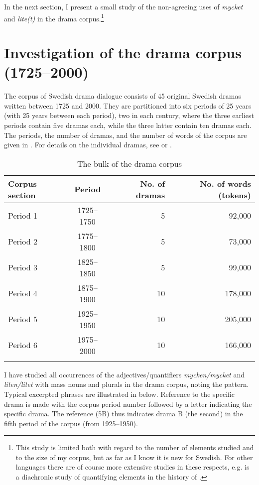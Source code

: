 \documentclass[output=paper]{langscibook}
\begin{document}
In the next section, I present a small study of the non-agreeing uses of \textit{mycket} and \textit{lite(t)} in the drama corpus.\footnote{This study is limited both with regard to the number of elements studied and to the size of my corpus, but as far as I know it is new for Swedish. For other languages there are of course more extensive studies in these respects, e.g. \citet{RoehrsSapp2016} is a diachronic study of quantifying elements in the history of .} 


\section{Investigation of the drama corpus (1725–2000)}\label{sec:delsing:3}


The corpus of Swedish drama dialogue consists of 45 original Swedish dramas written between 1725 and 2000. They are partitioned into six periods of 25 years (with 25 years between each period), two in each century, where the three earliest periods contain five dramas each, while the three latter contain ten dramas each. The periods, the number of dramas, and the number of words of the corpus are given in . For details on the individual dramas, see \citet{MarttalaStromquist2001} or \citet[38–39 and Appendix 1]{Stroh-Wollin2008}.



\begin{table}
\caption{The bulk of the drama corpus\label{tab:delsing:2}}
\begin{tabular}{lcrr}
\lsptoprule
Corpus section & Period & No. of dramas & No. of words (tokens)\\
\midrule
Period 1 & 1725–1750 & 5 & 92,000\\
Period 2 & 1775–1800 & 5 & 73,000\\
Period 3 & 1825–1850 & 5 & 99,000\\
Period 4 & 1875–1900 & 10 & 178,000\\
Period 5 & 1925–1950 & 10 & 205,000\\
Period 6 & 1975–2000 & 10 & 166,000\\
\lspbottomrule
\end{tabular}
\end{table}

I have studied all occurrences of the adjectives/quantifiers \textit{mycken/mycket} and \textit{liten/litet} with mass nouns and plurals in the drama corpus, noting the  pattern. Typical excerpted phrases are illustrated in  below. Reference to the specific drama is made with the corpus period number followed by a letter indicating the specific drama. The reference (5B) thus indicates drama B (the second) in the fifth period of the corpus (from 1925–1950).
\end{document}
